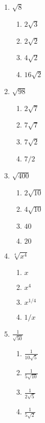 \documentclass{hw}
\begin{document}
\begin{enumerate}[label=\alph*.]
    \item $\sqrt{8}$
        \begin{enumerate}[label=\Alph*.]
            \item $2\sqrt{3}$
            \item $2\sqrt{2}$ %
            \item $4\sqrt{2}$
            \item $16\sqrt{2}$
        \end{enumerate}
    \item $\sqrt{98}$
        \begin{enumerate}[label=\Alph*.]
            \item $2\sqrt{7}$
            \item $7\sqrt{7}$
            \item $7\sqrt{2}$ %
            \item $7/2$
        \end{enumerate}
    \item $\sqrt{400}$
        \begin{enumerate}[label=\Alph*.]
            \item $2\sqrt{10}$
            \item $4\sqrt{10}$
            \item $40$
            \item $20$ %
        \end{enumerate}
        \item $\sqrt[4]{x^4}$
        \begin{enumerate}[label=\Alph*.]
            \item $x$
            \item $x^4$
            \item $x^{1/4}$
            \item $1/x$
        \end{enumerate}
        \item $\frac{1}{\sqrt{50}}$
        \begin{enumerate}[label=\Alph*.]
            \item $\frac{1}{10\sqrt{5}}$
            \item $\frac{1}{5\sqrt{10}}$
            \item $\frac{1}{2\sqrt{5}}$
            \item $\frac{1}{5\sqrt{2}}$
        \end{enumerate}
\end{enumerate}
\end{document}
